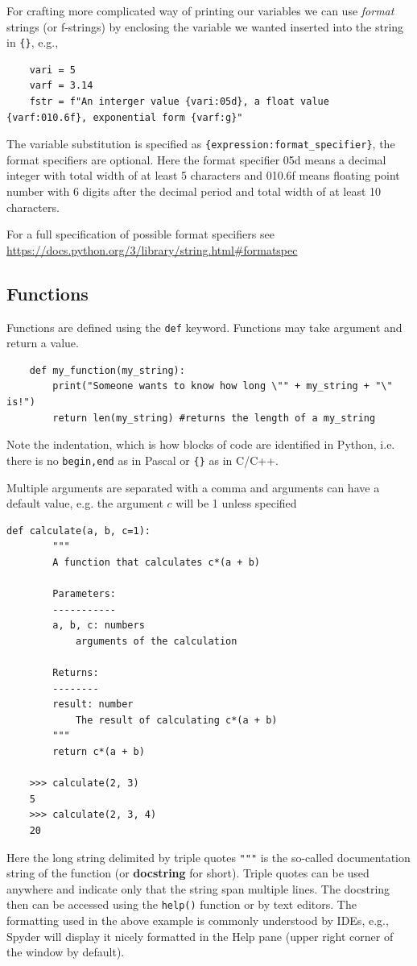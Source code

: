 \documentclass{article}
\begin{document}
For crafting more complicated way of printing our variables we can use \emph{format} strings (or f-strings) by enclosing the variable we wanted inserted into the string in \verb|{}|, e.g.,
\begin{lstlisting}
    vari = 5
    varf = 3.14
    fstr = f"An interger value {vari:05d}, a float value {varf:010.6f}, exponential form {varf:g}"
\end{lstlisting}
The variable substitution is specified as \verb|{expression:format_specifier}|, the format specifiers are optional. Here the format specifier 05d means a decimal integer with total width of at least 5 characters and 010.6f means floating point number with 6 digits after the decimal period and total width of at least 10 characters.

For a full specification of possible format specifiers see \url{https://docs.python.org/3/library/string.html#formatspec}

\subsection{Functions}
Functions are defined using the \verb|def| keyword. Functions may take argument and return a value.
\begin{lstlisting}
    def my_function(my_string):
        print("Someone wants to know how long \"" + my_string + "\" is!")
        return len(my_string) #returns the length of a my_string
\end{lstlisting}
Note the indentation, which is how blocks of code are identified in Python, i.e. there is no \verb|begin,end| as in Pascal or \verb|{}| as in C/C++.

Multiple arguments are separated with a comma and arguments can have a default value, e.g. the argument $c$ will be 1 unless specified
\begin{lstlisting}[caption=Function definition]
    def calculate(a, b, c=1):
        """
        A function that calculates c*(a + b)

        Parameters:
        -----------
        a, b, c: numbers
            arguments of the calculation

        Returns:
        --------
        result: number
            The result of calculating c*(a + b)
        """
        return c*(a + b)

    >>> calculate(2, 3)
    5
    >>> calculate(2, 3, 4)
    20
\end{lstlisting}
Here the long string delimited by triple quotes \lstinline{"""} is the so-called documentation string of the function (or \textbf{docstring} for short). Triple quotes can be used anywhere and indicate only that the string span multiple lines. The docstring then can be accessed using the \lstinline{help()} function or by text editors. The formatting used in the above example is commonly understood by IDEs, e.g., Spyder will display it nicely formatted in the Help pane (upper right corner of the window by default).
\end{document}
